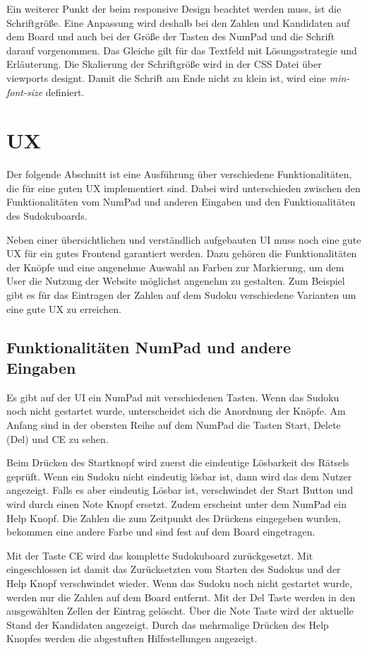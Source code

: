 Ein weiterer Punkt der beim responsive Design beachtet werden muss, ist die Schriftgröße. Eine Anpassung wird deshalb bei den Zahlen und Kandidaten auf dem Board und auch bei der Größe der Tasten des NumPad und die Schrift darauf vorgenommen. Das Gleiche gilt für das Textfeld mit Lösungsstrategie und Erläuterung. Die Skalierung der Schriftgröße wird in der \ac{CSS} Datei über viewports designt. Damit die Schrift am Ende nicht zu klein ist, wird eine \textit{min-font-size} definiert. 


\section{\acl{UX}}
Der folgende Abschnitt ist eine Ausführung über verschiedene Funktionalitäten, die für eine guten \acl{UX} implementiert sind. Dabei wird unterschieden zwischen den Funktionalitäten vom NumPad und anderen Eingaben und den Funktionalitäten des Sudokuboards.

Neben einer übersichtlichen und verständlich aufgebauten \ac{UI} muss noch eine gute \ac{UX} für ein gutes Frontend garantiert werden. Dazu gehören die Funktionalitäten der Knöpfe und eine angenehme Auswahl an Farben zur Markierung, um dem User die Nutzung der Website möglichst angenehm zu gestalten. Zum Beispiel gibt es für das Eintragen der Zahlen auf dem Sudoku verschiedene Varianten um eine gute \ac{UX} zu erreichen. 

\subsection{Funktionalitäten NumPad und andere Eingaben}
Es gibt auf der \ac{UI} ein NumPad mit verschiedenen Tasten. Wenn das Sudoku noch nicht gestartet wurde, unterscheidet sich die Anordnung der Knöpfe. Am Anfang sind in der obersten Reihe auf dem NumPad die Tasten Start, Delete (Del) und \ac{CE} zu sehen. 

Beim Drücken des Startknopf wird zuerst die eindeutige Lösbarkeit des Rätsels geprüft. Wenn ein Sudoku nicht eindeutig lösbar ist, dann wird das dem Nutzer angezeigt. Falls es aber eindeutig Lösbar ist, verschwindet der Start Button und wird durch einen Note Knopf ersetzt. Zudem erscheint unter dem NumPad ein Help Knopf. Die Zahlen die zum Zeitpunkt des Drückens eingegeben wurden, bekommen eine andere Farbe und sind fest auf dem Board eingetragen. 

Mit der Taste \ac{CE} wird das komplette Sudokuboard zurückgesetzt. Mit eingeschlossen ist damit das Zurücksetzten vom Starten des Sudokus und der Help Knopf verschwindet wieder. Wenn das Sudoku noch nicht gestartet wurde, werden nur die Zahlen auf dem Board entfernt. Mit der Del Taste werden in den ausgewählten Zellen der Eintrag gelöscht. Über die Note Taste wird der aktuelle Stand der Kandidaten angezeigt. Durch das mehrmalige Drücken des Help Knopfes werden die abgestuften Hilfestellungen angezeigt.


